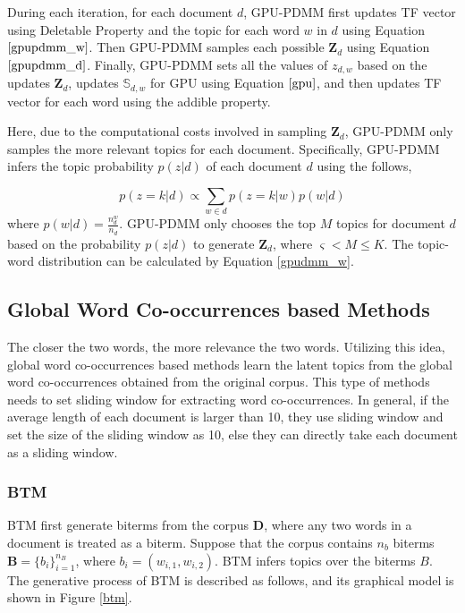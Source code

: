 \documentclass[10pt,journal,compsoc]{IEEEtran}
\begin{document}
{During each iteration, for each document $d$, GPU-PDMM first updates TF vector using Deletable Property and the topic for each word $w$ in $d$ using Equation $\ref{gpupdmm_w}$. Then GPU-PDMM samples each possible $\textbf{Z}_d$ using Equation $\ref{gpupdmm_d}$. Finally, GPU-PDMM sets all the values of $z_{d,w}$ based on the updates $\textbf{Z}_d$, updates $\mathbb{S}_{d,w}$ for GPU using Equation $\ref{gpu}$, and then updates TF vector for each word using the addible property.

Here, due to the computational costs involved in sampling $\textbf{Z}_d$, GPU-PDMM only samples the more relevant topics for each document. Specifically, GPU-PDMM infers the topic probability $p(z|d)$ of each document $d$ using the follows,

\[
p(z=k|d) \propto \sum_{w \in d} p(z=k|w)p(w|d)
\]
where $p(w|d)=\frac{n_d^w}{n_d}$. GPU-PDMM only chooses the top $M$ topics for document $d$ based on the probability $p(z|d)$ to generate $\textbf{Z}_d$, where $\varsigma<M\leq K$. The topic-word distribution can be calculated by Equation \ref{gpudmm_w}.


\subsection{Global Word Co-occurrences based Methods}

The closer the two words, the more relevance the two words. Utilizing this idea, global word co-occurrences based methods learn the latent topics from the global word co-occurrences obtained from the original corpus. This type of methods needs to set sliding window for extracting word co-occurrences. In general, if the average length of each document is larger than 10, they use sliding window and set the size of the sliding window as 10, else they can directly take each document as a sliding window. 

\subsubsection{BTM}

BTM \cite{cheng2014btm} first generate biterms from the corpus $\bm{D}$, where any two words in a document is treated as a biterm. Suppose that the corpus contains $n_b$ biterms $\textbf{B}=\{b_i\}_{i=1}^{n_B}$, where $b_i=(w_{i,1},w_{i,2})$. BTM infers topics over the biterms $B$. The generative process of BTM is described as follows, and its graphical model is shown in Figure \ref{btm}.

}
\end{document}
